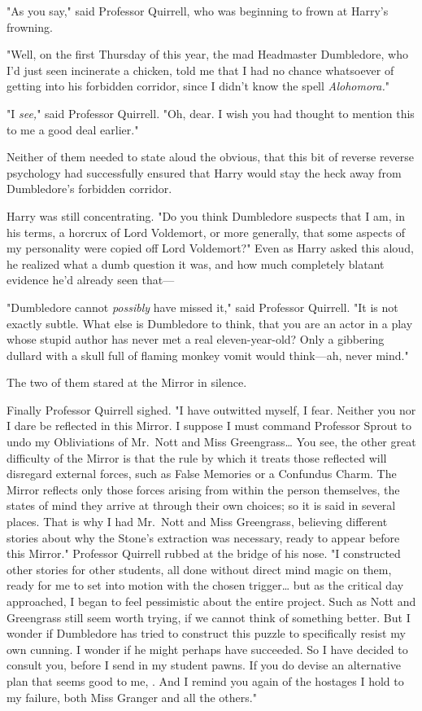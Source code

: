 "As you say," said Professor Quirrell, who was beginning to frown at Harry's 
frowning.

"Well, on the first Thursday of this year, the mad Headmaster Dumbledore, who 
I'd just seen incinerate a chicken, told me that I had no chance whatsoever of 
getting into his forbidden corridor, since I didn't know the spell 
\emph{Alohomora.}"

"I \emph{see,}" said Professor Quirrell. "Oh, dear. I wish you had thought to 
mention this to me a good deal earlier."

Neither of them needed to state aloud the obvious, that this bit of reverse 
reverse psychology had successfully ensured that Harry would stay the heck away 
from Dumbledore's forbidden corridor.

Harry was still concentrating. "Do you think Dumbledore suspects that I am, in 
his terms, a horcrux of Lord Voldemort, or more generally, that some aspects of 
my personality were copied off Lord Voldemort?" Even as Harry asked this aloud, 
he realized what a dumb question it was, and how much completely blatant 
evidence he'd already seen that---

"Dumbledore cannot \emph{possibly} have missed it," said Professor Quirrell. 
"It is not exactly subtle. What else is Dumbledore to think, that you are an 
actor in a play whose stupid author has never met a real eleven-year-old? Only 
a gibbering dullard with a skull full of flaming monkey vomit would think---ah, 
never mind."

The two of them stared at the Mirror in silence.

Finally Professor Quirrell sighed. "I have outwitted myself, I fear. Neither 
you nor I dare be reflected in this Mirror. I suppose I must command Professor 
Sprout to undo my Obliviations of Mr.~Nott and Miss Greengrass{\ldots} You see, 
the other great difficulty of the Mirror is that the rule by which it treats 
those reflected will disregard external forces, such as False Memories or a 
Confundus Charm. The Mirror reflects only those forces arising from within the 
person themselves, the states of mind they arrive at through their own choices; 
so it is said in several places. That is why I had Mr.~Nott and Miss 
Greengrass, believing different stories about why the Stone's extraction was 
necessary, ready to appear before this Mirror." Professor Quirrell rubbed at 
the bridge of his nose. "I constructed other stories for other students, all 
done without direct mind magic on them, ready for me to set into motion with 
the chosen trigger{\ldots} but as the critical day approached, I began to feel 
pessimistic about the entire project. Such as Nott and Greengrass still seem 
worth trying, if we cannot think of something better. But I wonder if 
Dumbledore has tried to construct this puzzle to specifically resist my own 
cunning. I wonder if he might perhaps have succeeded. So I have decided to 
consult you, before I send in my student pawns. If you do devise an alternative 
plan that seems good to me, . And I remind you again of the hostages I hold to my failure, both 
Miss Granger and all the others."

